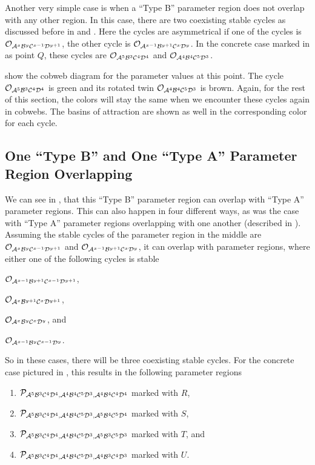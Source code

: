 Another very simple case is when a ``Type B'' parameter region does not overlap with any other region.
In this case, there are two coexisting stable cycles as discussed before in  and .
Here the cycles are asymmetrical if one of the cycles is $\mathcal{O}_{\mathcal{A}^x\mathcal{B}^y\mathcal{C}^{x-1}\mathcal{D}^{y+1}}$, the other cycle is $\mathcal{O}_{\mathcal{A}^{x-1}\mathcal{B}^{y+1}\mathcal{C}^x\mathcal{D}^y}$.
In the concrete case marked in  as point $Q$, these cycles are $\mathcal{O}_{\mathcal{A}^5\mathcal{B}^3\mathcal{C}^4\mathcal{D}^4}$ and $\mathcal{O}_{\mathcal{A}^4\mathcal{B}^4\mathcal{C}^5\mathcal{D}^3}$.

 show the cobweb diagram for the parameter values at this point.
The cycle $\mathcal{O}_{\mathcal{A}^5\mathcal{B}^3\mathcal{C}^4\mathcal{D}^4}$ is green and its rotated twin $\mathcal{O}_{\mathcal{A}^4\mathcal{B}^4\mathcal{C}^5\mathcal{D}^3}$ is brown.
Again, for the rest of this section, the colors will stay the same when we encounter these cycles again in cobwebs.
The basins of attraction are shown as well in the corresponding color for each cycle.

\subsection{One ``Type B'' and One ``Type A'' Parameter Region Overlapping}
\label{sec:minrep.coex.BA}

We can see in , that this ``Type B'' parameter region can overlap with ``Type A'' parameter regions.
This can also happen in four different ways, as was the case with ``Type A'' parameter regions overlapping with one another (described in ).
Assuming the stable cycles of the parameter region in the middle are $\mathcal{O}_{\mathcal{A}^x\mathcal{B}^y\mathcal{C}^{x-1}\mathcal{D}^{y+1}}$ and $\mathcal{O}_{\mathcal{A}^{x-1}\mathcal{B}^{y+1}\mathcal{C}^x\mathcal{D}^y}$, it can overlap with parameter regions, where either one of the following cycles is stable
\begin{enumerate*}
    \item $\mathcal{O}_{\mathcal{A}^{x-1}\mathcal{B}^{y+1}\mathcal{C}^{x-1}\mathcal{D}^{y+1}}$,
    \item $\mathcal{O}_{\mathcal{A}^x\mathcal{B}^{y+1}\mathcal{C}^x\mathcal{D}^{y+1}}$,
    \item $\mathcal{O}_{\mathcal{A}^x\mathcal{B}^y\mathcal{C}^x\mathcal{D}^y}$, and
    \item $\mathcal{O}_{\mathcal{A}^{x-1}\mathcal{B}^y\mathcal{C}^{x-1}\mathcal{D}^y}$.
\end{enumerate*}
So in these cases, there will be three coexisting stable cycles.
For the concrete case pictured in , this results in the following parameter regions
\begin{enumerate}
    \item $\mathcal{P}_{\mathcal{A}^5\mathcal{B}^3\mathcal{C}^4\mathcal{D}^4, \mathcal{A}^4\mathcal{B}^4\mathcal{C}^5\mathcal{D}^3, \mathcal{A}^4\mathcal{B}^4\mathcal{C}^4\mathcal{D}^4}$ marked with $R$,
    \item $\mathcal{P}_{\mathcal{A}^5\mathcal{B}^3\mathcal{C}^4\mathcal{D}^4, \mathcal{A}^4\mathcal{B}^4\mathcal{C}^5\mathcal{D}^3, \mathcal{A}^5\mathcal{B}^4\mathcal{C}^5\mathcal{D}^4}$ marked with $S$,
    \item $\mathcal{P}_{\mathcal{A}^5\mathcal{B}^3\mathcal{C}^4\mathcal{D}^4, \mathcal{A}^4\mathcal{B}^4\mathcal{C}^5\mathcal{D}^3, \mathcal{A}^5\mathcal{B}^3\mathcal{C}^5\mathcal{D}^3}$ marked with $T$, and
    \item $\mathcal{P}_{\mathcal{A}^5\mathcal{B}^3\mathcal{C}^4\mathcal{D}^4, \mathcal{A}^4\mathcal{B}^4\mathcal{C}^5\mathcal{D}^3, \mathcal{A}^4\mathcal{B}^3\mathcal{C}^4\mathcal{D}^3}$ marked with $U$.
\end{enumerate}

